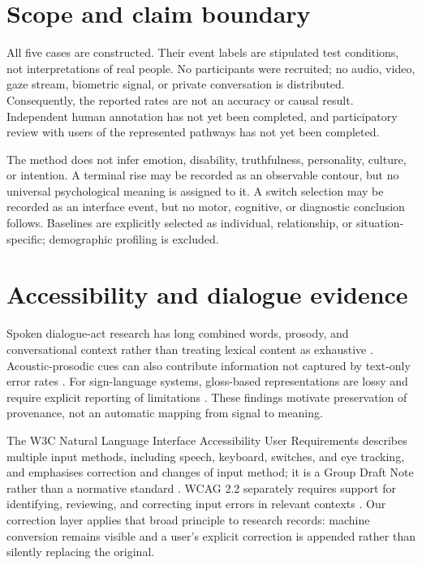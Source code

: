 \documentclass[11pt,a4paper]{article}
\begin{document}
\section{Scope and claim boundary}
All five cases are constructed. Their event labels are stipulated test conditions, not interpretations of real people. No participants were recruited; no audio, video, gaze stream, biometric signal, or private conversation is distributed. Consequently, the reported rates are not an accuracy or causal result. Independent human annotation has not yet been completed, and participatory review with users of the represented pathways has not yet been completed.

The method does not infer emotion, disability, truthfulness, personality, culture, or intention. A terminal rise may be recorded as an observable contour, but no universal psychological meaning is assigned to it. A switch selection may be recorded as an interface event, but no motor, cognitive, or diagnostic conclusion follows. Baselines are explicitly selected as individual, relationship, or situation-specific; demographic profiling is excluded.

\section{Accessibility and dialogue evidence}
Spoken dialogue-act research has long combined words, prosody, and conversational context rather than treating lexical content as exhaustive \cite{stolcke2000dialogue}. Acoustic-prosodic cues can also contribute information not captured by text-only error rates \cite{kafle2019prosodic}. For sign-language systems, gloss-based representations are lossy and require explicit reporting of limitations \cite{muller2023gloss}. These findings motivate preservation of provenance, not an automatic mapping from signal to meaning.

The W3C Natural Language Interface Accessibility User Requirements describes multiple input methods, including speech, keyboard, switches, and eye tracking, and emphasises correction and changes of input method; it is a Group Draft Note rather than a normative standard \cite{w3c2022naur}. WCAG 2.2 separately requires support for identifying, reviewing, and correcting input errors in relevant contexts \cite{w3c2023wcag22}. Our correction layer applies that broad principle to research records: machine conversion remains visible and a user's explicit correction is appended rather than silently replacing the original.
\end{document}
